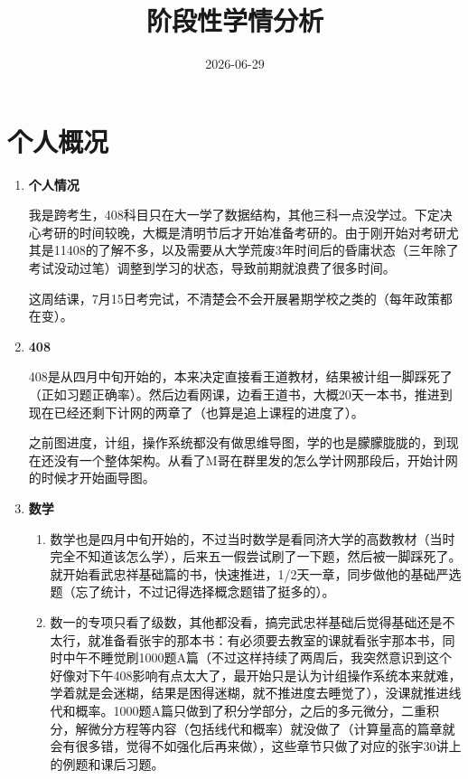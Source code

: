 \documentclass[12pt,a4paper]{ctexart}
\title{\textbf{阶段性学情分析}}
\author{2026-06-29}
\date{}
\begin{document}
\maketitle
\thispagestyle{empty}
\newpage
\tableofcontents
\newpage

\section{个人概况}

\begin{enumerate}[leftmargin=*,itemsep=6pt]
    \item \textbf{个人情况}

    我是跨考生，408科目只在大一学了数据结构，其他三科一点没学过。下定决心考研的时间较晚，大概是清明节后才开始准备考研的。由于刚开始对考研尤其是11408的了解不多，以及需要从大学荒废3年时间后的昏庸状态（三年除了考试没动过笔）调整到学习的状态，导致前期就浪费了很多时间。
    
    这周结课，7月15日考完试，不清楚会不会开展暑期学校之类的（每年政策都在变）。

    \item \textbf{408}

    408是从四月中旬开始的，本来决定直接看王道教材，结果被计组一脚踩死了（正如习题正确率）。然后边看网课，边看王道书，大概20天一本书，推进到现在已经还剩下计网的两章了（也算是追上课程的进度了）。

    之前图进度，计组，操作系统都没有做思维导图，学的也是朦朦胧胧的，到现在还没有一个整体架构。从看了M哥在群里发的怎么学计网那段后，开始计网的时候才开始画导图。

    \item \textbf{数学}
    
    \begin{enumerate}[label=\arabic*.,leftmargin=*]

    \item  数学也是四月中旬开始的，不过当时数学是看同济大学的高数教材（当时完全不知道该怎么学），后来五一假尝试刷了一下题，然后被一脚踩死了。就开始看武忠祥基础篇的书，快速推进，1/2天一章，同步做他的基础严选题（忘了统计，不过记得选择概念题错了挺多的）。

    \item 数一的专项只看了级数，其他都没看，搞完武忠祥基础后觉得基础还是不太行，就准备看张宇的那本书：有必须要去教室的课就看张宇那本书，同时中午不睡觉刷1000题A篇（不过这样持续了两周后，我突然意识到这个好像对下午408影响有点太大了，最开始只是认为计组操作系统本来就难，学着就是会迷糊，结果是困得迷糊，就不推进度去睡觉了），没课就推进线代和概率。1000题A篇只做到了积分学部分，之后的多元微分，二重积分，解微分方程等内容（包括线代和概率）就没做了（计算量高的篇章就会有很多错，觉得不如强化后再来做），这些章节只做了对应的张宇30讲上的例题和课后习题。


\end{enumerate}
\end{enumerate}
\end{document}
